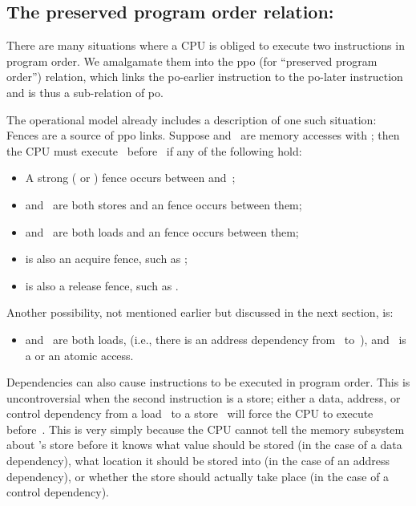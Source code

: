 \subsection{The preserved program order relation: }
\label{sec:docs:explanation:The Preserved Program Order Relation: ppo}

There are many situations where a CPU is obliged to execute two
instructions in program order.
We amalgamate them into the ppo (for ``preserved program order'')
relation, which links the po-earlier instruction to the po-later
instruction and is thus a sub-relation of po.

The operational model already includes a description of one such
situation:
Fences are a source of ppo links.
Suppose  and~ are memory accesses with ;
then the CPU must execute~ before~ if any of the following hold:

\begin{itemize}
\item	A strong ( or ) fence occurs between
	 and~;

\item	{} and~ are both stores and an  fence occurs between
	them;

\item	{} and~ are both loads and an  fence occurs between
	them;

\item	{} is also an acquire fence, such as ;

\item	{} is also a release fence, such as .
\end{itemize}

Another possibility, not mentioned earlier but discussed in the next
section, is:

\begin{itemize}
\item	{} and~ are both loads,  (i.e., there is an address
	dependency from~ to~), and ~is a  or an atomic
	access.
\end{itemize}

Dependencies can also cause instructions to be executed in program
order.
This is uncontroversial when the second instruction is a
store; either a data, address, or control dependency from a load~ to
a store~ will force the CPU to execute  before~.
This is very
simply because the CPU cannot tell the memory subsystem about 's
store before it knows what value should be stored (in the case of a
data dependency), what location it should be stored into (in the case
of an address dependency), or whether the store should actually take
place (in the case of a control dependency).

